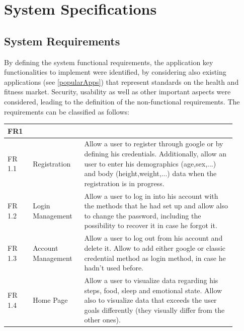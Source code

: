 \newpage
\section{System Specifications}
\subsection{System Requirements}
By defining the system functional requirements, the application key functionalities to implement were identified, by considering also existing applications (see \cref{popularApps}) that represent standards on the health and fitness market. Security, usability as well as other important aspects were considered, leading to the definition of the non-functional requirements. The requirements can be classified as follows:
\vspace{5ex}
\begin{table}[h!]
    \setstretch{\myspacing}
    \centering
    \begin{tabular}{|>{\raggedright\arraybackslash}p{0.1\linewidth}|>{\raggedright\arraybackslash}p{0.2\linewidth}|>{\raggedright\arraybackslash}p{0.6\linewidth}|}
        \hline
        \textbf{FR1} & \multicolumn{2}{>{\centering\arraybackslash}p{0.7\linewidth}|}{\textbf{User Management}} \\
        \hline
        FR 1.1 & Registration & Allow a user to register through google or by defining his credentials. Additionally, allow an user to enter his demographics (age,sex,...) and body (height,weight,...) data when the registration is in progress. \\
        \hline
        FR 1.2 & Login Management & Allow a user to log in into his account with the methods that he had set up and allow also to change the password, including the possibility to recover it in case he forgot it.  \\
        \hline
        FR 1.3 & Account Management & Allow a user to log out from his account and delete it. Allow to add either google or classic credential method as login method, in case he hadn't used before.  \\
        \hline
        FR 1.4 & Home Page & Allow a user to visualize data regarding his steps, food, sleep and emotional state. Allow also to visualize data that exceeds the user goals differently (they visually differ from the other ones). \\
        \hline
    \end{tabular}
\end{table}


